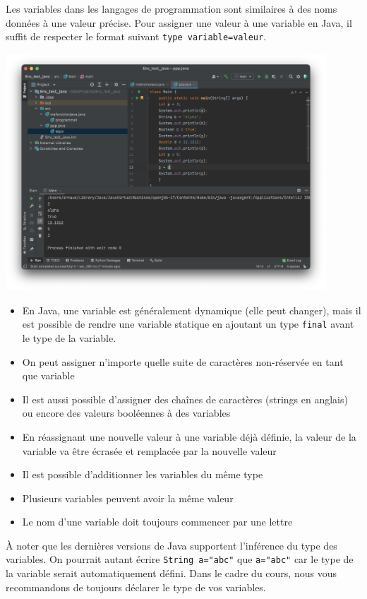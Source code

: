Les variables dans les langages de programmation sont similaires à des noms données à une valeur précise.
Pour assigner une valeur à une variable en Java, il suffit de respecter le format suivant \lstinline{type variable=valeur}.

\begin{center}
\includegraphics[width=12cm]{variables}	
\end{center}

\begin{conseil}
\begin{itemize}
	\item En Java, une variable est généralement dynamique (elle peut changer), mais il est possible de rendre une variable statique en ajoutant un type \lstinline{final} avant le type de la variable.
	\item On peut assigner n'importe quelle suite de caractères non-réservée en tant que variable
	\item Il est aussi possible d'assigner des chaînes de caractères (strings en anglais) ou encore des valeurs booléennes à des variables
	\item En réassignant une nouvelle valeur à une variable déjà définie, la valeur de la variable va être écrasée et remplacée par la nouvelle valeur
	\item Il est possible d'additionner les variables du même type
	\item Plusieurs variables peuvent avoir la même valeur
	\item Le nom d'une variable doit toujours commencer par une lettre
\end{itemize}

\end{conseil}
À noter que les dernières versions de Java supportent l'inférence du type des variables. On pourrait autant écrire \lstinline{String a="abc"} que \lstinline{a="abc"} car le type de la variable serait automatiquement défini. 
Dans le cadre du cours, nous vous recommandons de toujours déclarer le type de vos variables.

